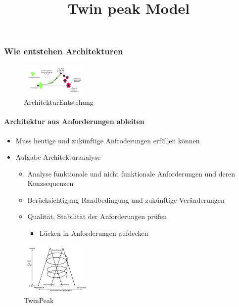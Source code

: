 \documentclass{article}
\begin{document}
\subsubsection{Wie entstehen Architekturen}

\begin{figure}[H]
\centering				\includegraphics[width=0.3\textwidth] {Resources/Images/ArchitekturEntstehung.png}
\caption{\label{fig:ArchitekturEntstehung}ArchitekturEntstehung}
\end{figure} 

\paragraph{Architektur aus Anforderungen ableiten}

\begin{itemize}
	\item Muss heutige und zukünftige Anfroderungen erfüllen können
	\item Aufgabe Architekturanalyse
	\begin{itemize}
		\item Analyse funktionale und nicht funktionale Anforderungen und deren Konzsequenzen
		\item  Berücksichtigung Randbedingung und zukünftige Veränderungen
		\item Qualität, Stabilität der Anforderungen prüfen
		\begin{itemize}
			\item Lücken in Anforderungen aufdecken
		\end{itemize}
	\end{itemize}
\end{itemize}


\title{Twin peak Model}
\begin{figure}[H]
\centering				\includegraphics[width=0.3\textwidth] {Resources/Images/TwinPeak.png}
\caption{\label{fig:TwinPeak}TwinPeak}
\end{figure}
\end{document}
